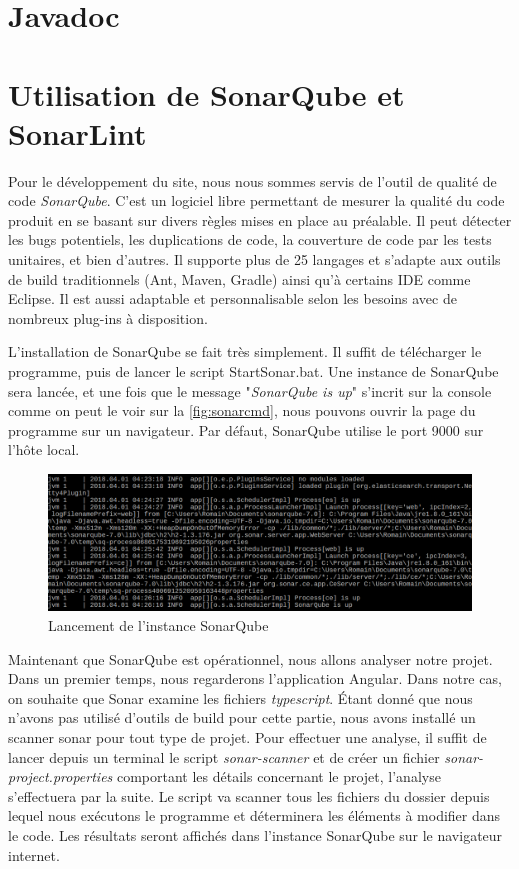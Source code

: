\documentclass{polytech/polytech}
\begin{document}
\section{Javadoc}


\section{Utilisation de SonarQube et SonarLint}

Pour le développement du site, nous nous sommes servis de l'outil de qualité de code \textit{SonarQube}. C'est un logiciel libre permettant de mesurer la qualité du code produit en se basant sur divers règles mises en place au préalable. Il peut détecter les bugs potentiels, les duplications de code, la couverture de code par les tests unitaires, et bien d'autres. Il supporte plus de 25 langages et s'adapte aux outils de build traditionnels (Ant, Maven, Gradle) ainsi qu'à certains IDE comme Eclipse. Il est aussi adaptable et personnalisable selon les besoins avec de nombreux plug-ins à disposition.

L'installation de SonarQube se fait très simplement. Il suffit de télécharger le programme, puis de lancer le script StartSonar.bat. Une instance de SonarQube sera lancée, et une fois que le message "\textit{SonarQube is up}" s'incrit sur la console comme on peut le voir sur la \autoref{fig:sonarcmd}, nous pouvons ouvrir la page du programme sur un navigateur. Par défaut, SonarQube utilise le port 9000 sur l'hôte local.


\begin{figure}
	\includegraphics[scale=0.6]{sonarcmd.png}
	\caption{Lancement de l'instance SonarQube}
	\label{fig:sonarcmd}
\end{figure}


Maintenant que SonarQube est opérationnel, nous allons analyser notre projet. Dans un premier temps, nous regarderons l'application Angular. Dans notre cas, on souhaite que Sonar examine les fichiers \textit{typescript}. \'{E}tant donné que nous n'avons pas utilisé d'outils de build pour cette partie, nous avons installé un scanner sonar pour tout type de projet. Pour effectuer une analyse, il suffit de lancer depuis un terminal le script \textit{sonar-scanner} et de créer un fichier \textit{sonar-project.properties} comportant les détails concernant le projet, l'analyse s'effectuera par la suite. Le script va scanner tous les fichiers du dossier depuis lequel nous exécutons le programme et déterminera les éléments à modifier dans le code. Les résultats seront affichés dans l'instance SonarQube sur le navigateur internet.
\end{document}
